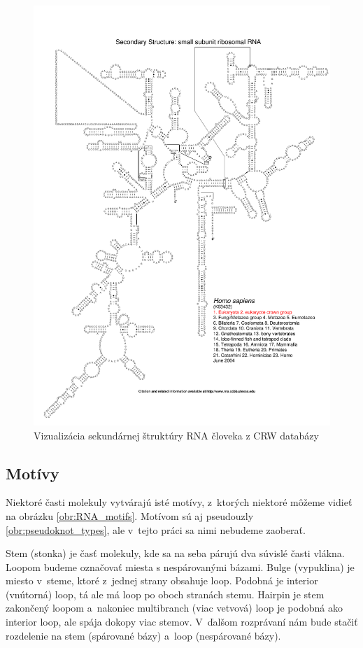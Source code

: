 \begin{figure}
  \includegraphics[width=1\textwidth]{../img/human_crw}
  \caption{Vizualizácia sekundárnej štruktúry RNA človeka z CRW databázy }
  \label{obr:human_crw}
\end{figure}




\subsection{Motívy}

Niektoré časti molekuly vytvárajú isté motívy, z~ktorých niektoré môžeme
vidieť na obrázku \ref{obr:RNA_motifs}.
Motívom sú aj pseudouzly \ref{obr:pseudoknot_types}, ale v~tejto práci
sa nimi nebudeme zaoberať.

Stem (stonka) je časť molekuly, kde sa na seba párujú dva súvislé časti vlákna.
Loopom budeme označovať miesta s nespárovanými bázami.
Bulge (vypuklina) je miesto v~steme, ktoré z~jednej strany obsahuje loop.
Podobná je interior (vnútorná) loop, tá ale má loop po oboch stranách stemu.
Hairpin je stem zakončený loopom a~nakoniec multibranch (viac vetvová) loop
je podobná ako interior loop, ale spája dokopy viac stemov.
V~ďalšom rozprávaní nám bude stačiť rozdelenie na stem (spárované bázy)
a~loop (nespárované bázy).

